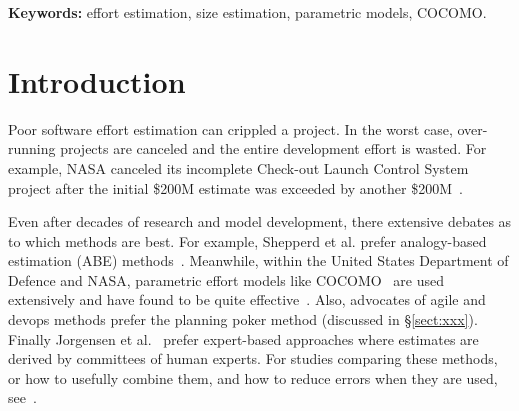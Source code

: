 \documentclass[final,twocolumn,5p]{elsarticle}
\newcommand{\tion}[1]{\S\ref{sect:#1}}
\begin{document}

 
\vspace{1mm}
\noindent
{\bf Keywords:} effort estimation, size estimation, parametric models, COCOMO.
{} %

\section{Introduction}
Poor software effort estimation can crippled a project.
In
the worst case, over-running projects are canceled and
the entire development effort is wasted. For example,
NASA canceled its incomplete Check-out Launch Control
System project after the initial \$200M estimate was
exceeded by another \$200M~\cite{clcs03}.

Even after decades of research and model
development, there extensive debates as to which
methods are best.  For example, Shepperd et
al. prefer analogy-based estimation (ABE)
methods~\cite{Shepperd1997}.  Meanwhile, within the
United States Department of Defence and NASA,
parametric effort models like
COCOMO~\cite{Boehm1981} are used extensively and
have found to be quite effective~\cite{Lum2002}.
Also, advocates of agile and devops methods prefer
the planning poker method (discussed in \tion{xxx}).
Finally Jorgensen et al.~\cite{jorgensen09} prefer
expert-based approaches where estimates are derived
by committees of human experts.  For studies
comparing these methods, or how to usefully combine
them, and how to reduce errors when they are used,
see~\cite{koc11b,Minku2013,garg15,me13a,koc11b}.
\end{document}

